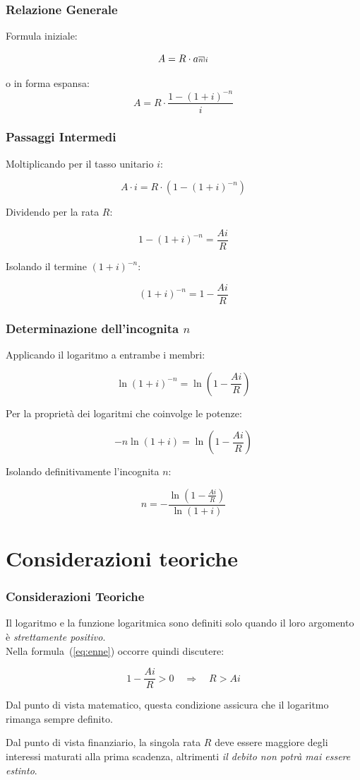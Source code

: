 \documentclass{beamer}
\makeatletter
\newcommand{\figurato}[2]{%
\def\arraystretch{0}\setlength\arraycolsep{1pt}
    \begin{array}[b]{@{}c|c}
        \multicolumn{2}{c}{\rule{0pt}{2pt}}\\\cline{1-1}
        \\[2\arraycolsep]\scriptstyle #1&\smash{\scriptstyle #2}
    \end{array}
}
\makeatother
\begin{document}
\begin{frame}
    \frametitle{Relazione Generale}

    Formula iniziale:

    $$ A = R \cdot{a\figurato{n}{i}} $$

    o in forma espansa:
    $$ A = R \cdot \frac{1 - (1+i)^{-n}}{i} $$
\end{frame}

\begin{frame}
    \frametitle{Passaggi Intermedi}

    Moltiplicando per il tasso unitario $i$:
    
    $$ A \cdot i = R \cdot (1 - (1+i)^{-n}) $$
   
    Dividendo per la rata $R$:

    $$ 1 - (1+i)^{-n} = \frac{Ai}{R} $$

    Isolando il termine $(1+i)^{-n}$:
    
    $$ (1+i)^{-n} = 1 - \frac{Ai}{R} $$
\end{frame}

\begin{frame}
    \frametitle{Determinazione dell'incognita $n$}

    Applicando il logaritmo a entrambe i membri:
    
    $$ \ln(1+i)^{-n} = \ln\left(1 - \frac{Ai}{R}\right) $$

    Per la proprietà dei logaritmi che coinvolge le potenze:
    
    $$ -n \ln(1+i) = \ln\left(1 - \frac{Ai}{R}\right) $$

    Isolando definitivamente l'incognita $n$:
    
    \begin{equation}
        \boxed{n = -\frac{\ln\left(1 - \frac{Ai}{R}\right)}{\ln(1+i)}}
        \label{eq:enne}
    \end{equation}
        
    
\end{frame}

\section{Considerazioni teoriche}

\begin{frame}
    \frametitle{Considerazioni Teoriche}

    Il logaritmo e la funzione logaritmica sono definiti solo quando il loro argomento è \emph{strettamente positivo}.\\[1em]

    Nella formula~(\ref{eq:enne}) occorre quindi discutere:

    \[
        1-\frac{Ai}{R} > 0 \quad \Rightarrow \quad R > Ai 
    \]
    


    Dal punto di vista matematico, questa condizione assicura che il logaritmo rimanga sempre definito.

    Dal punto di vista finanziario, la singola rata $R$ deve essere maggiore degli interessi maturati alla prima scadenza, altrimenti \emph{il debito non potrà mai essere estinto}.
\end{frame}
\end{document}
